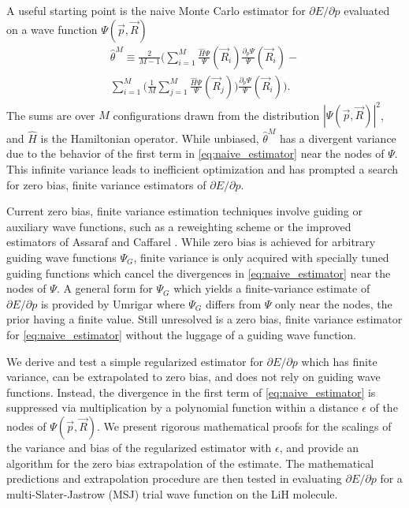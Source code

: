 \documentclass[twocolumn]{revtex4-1}
\begin{document}
A useful starting point is the naive Monte Carlo estimator for $\partial E/\partial p$ evaluated on a wave function $\Psi(\vec{p}, \vec{R})$ 
\begin{equation}
\begin{split}
\hat{\theta}^M \equiv \frac{2}{M-1}\Bigg(\sum_{i=1}^M \frac{\hat{H}\Psi}{\Psi}(\vec{R}_i) \frac{\partial_p \Psi}{\Psi}(\vec{R}_i)- \\ \sum_{i=1}^M \Big(\frac{1}{M} \sum_{j=1}^M \frac{\hat{H}\Psi}{\Psi}(\vec{R}_j)\Big)\frac{\partial_p \Psi}{\Psi}(\vec{R}_i) \Bigg). 
\end{split}
\label{eq:naive_estimator}
\end{equation}
The sums are over $M$ configurations drawn from the distribution $|\Psi(\vec{p}, \vec{R})|^2$, and $\hat{H}$ is the Hamiltonian operator.
While unbiased, $\hat{\theta}^M$ has a divergent variance \cite{Avella} due to the behavior of the first term in \eqref{eq:naive_estimator} near the nodes of $\Psi$.
This infinite variance leads to inefficient optimization and has prompted a search for zero bias, finite variance estimators of $\partial E/\partial p$.

Current zero bias, finite variance estimation techniques involve guiding or auxiliary wave functions, such as a reweighting scheme \cite{Avella, Attaccalite2008} or the improved estimators of Assaraf and Caffarel \cite{doi:10.1063/1.1286598, Assaraf2003}.
While zero bias is achieved for arbitrary guiding wave functions $\Psi_G$, finite variance is only acquired with specially tuned guiding functions which cancel the divergences in \eqref{eq:naive_estimator} near the nodes of $\Psi$.
A general form for $\Psi_G$ which yields a finite-variance estimate of $\partial E/\partial p$ is provided by Umrigar \cite{doi:10.1063/1.4933112} where $\Psi_G$ differs from $\Psi$ only near the nodes, the prior having a finite value.
Still unresolved is a zero bias, finite variance estimator for \eqref{eq:naive_estimator} without the luggage of a guiding wave function. 

We derive and test a simple regularized estimator for $\partial E/\partial p$ which has finite variance, can be extrapolated to zero bias, and does not rely on guiding wave functions.
Instead, the divergence in the first term of \eqref{eq:naive_estimator} is suppressed via multiplication by a polynomial function within a distance $\epsilon$ of the nodes of $\Psi(\vec{p}, \vec{R})$. 
We present rigorous mathematical proofs for the scalings of the variance and bias of the regularized estimator with $\epsilon$, and provide an algorithm for the zero bias extrapolation of the estimate.
The mathematical predictions and extrapolation procedure are then tested in evaluating $\partial E/\partial p$ for a multi-Slater-Jastrow (MSJ) trial wave function on the LiH molecule.
\end{document}
